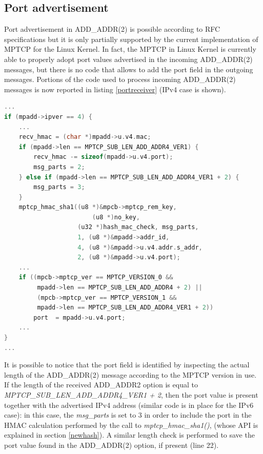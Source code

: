 \subsection{Port advertisement}
\label{portad}
Port advertisement in ADD\_ADDR(2) is possible according to RFC specifications but it is only partially supported by the current implementation of MPTCP for the Linux Kernel. In fact, the MPTCP in Linux Kernel is currently able to properly adopt port values advertised in the incoming ADD\_ADDR(2) messages, but there is no code that allows to add the port field in the outgoing messages.
Portions of the code used to process incoming ADD\_ADDR(2) messages is now reported in listing \ref{portreceiver} (IPv4 case is shown).

\begin{lstlisting}[language=c, caption=Handling port field in ADD\_ADDR2 at the receiver, label=portreceiver]
...
if (mpadd->ipver == 4) {
    ...
	recv_hmac = (char *)mpadd->u.v4.mac;
	if (mpadd->len == MPTCP_SUB_LEN_ADD_ADDR4_VER1) {
		recv_hmac -= sizeof(mpadd->u.v4.port);
		msg_parts = 2;
	} else if (mpadd->len == MPTCP_SUB_LEN_ADD_ADDR4_VER1 + 2) {
		msg_parts = 3;
	}
	mptcp_hmac_sha1((u8 *)&mpcb->mptcp_rem_key,
	        			(u8 *)no_key,
			      	(u32 *)hash_mac_check, msg_parts,
				    1, (u8 *)&mpadd->addr_id,
				    4, (u8 *)&mpadd->u.v4.addr.s_addr,
				    2, (u8 *)&mpadd->u.v4.port);
	...
	if ((mpcb->mptcp_ver == MPTCP_VERSION_0 &&
	     mpadd->len == MPTCP_SUB_LEN_ADD_ADDR4 + 2) ||
	     (mpcb->mptcp_ver == MPTCP_VERSION_1 &&
	     mpadd->len == MPTCP_SUB_LEN_ADD_ADDR4_VER1 + 2))
		port  = mpadd->u.v4.port;
	...
}
...
\end{lstlisting}

It is possible to notice that the port field is identified by inspecting the actual length of the ADD\_ADDR(2) message according to the MPTCP version in use. If the length of the received ADD\_ADDR2 option is equal to \textit{MPTCP\_SUB\_LEN\_ADD\_ADDR4\_VER1 + 2}, then the port value is present together with the advertised IPv4 address (similar code is in place for the IPv6 case): in this case, the \textit{msg\_parts} is set to 3 in order to include the port in the HMAC calculation performed by the call to \textit{mptcp\_hmac\_sha1()}, (whose API is explained in section \ref{newhash}). A similar length check is performed to save the port value found in the ADD\_ADDR(2) option, if present (line 22).

